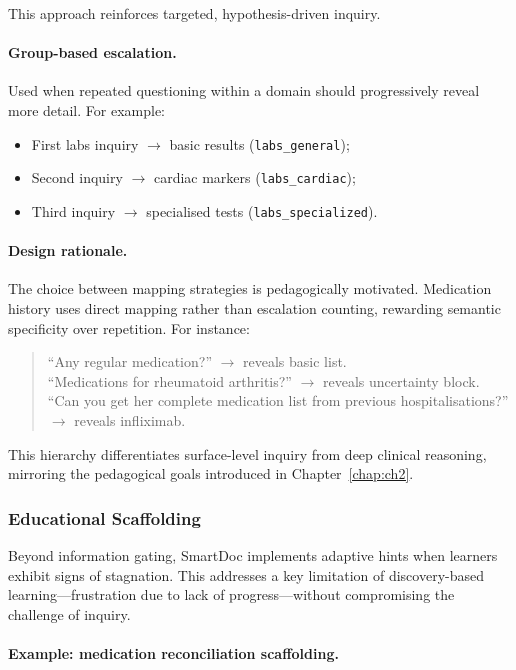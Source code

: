 This approach reinforces targeted, hypothesis-driven inquiry.

\paragraph{Group-based escalation.}
Used when repeated questioning within a domain should progressively reveal more
detail.
For example:

\begin{itemize}
  \item First labs inquiry $\rightarrow$ basic results (\texttt{labs\_general});
  \item Second inquiry $\rightarrow$ cardiac markers (\texttt{labs\_cardiac});
  \item Third inquiry $\rightarrow$ specialised tests (\texttt{labs\_specialized}).
\end{itemize}

\paragraph{Design rationale.}
The choice between mapping strategies is pedagogically motivated.
Medication history uses direct mapping rather than escalation counting,
rewarding semantic specificity over repetition.
For instance:

\begin{quote}
``Any regular medication?'' $\rightarrow$ reveals basic list.\\
``Medications for rheumatoid arthritis?'' $\rightarrow$ reveals uncertainty block.\\
``Can you get her complete medication list from previous hospitalisations?'' $\rightarrow$ reveals infliximab.
\end{quote}

This hierarchy differentiates surface-level inquiry from deep clinical reasoning,
mirroring the pedagogical goals introduced in Chapter~\ref{chap:ch2}.

\subsubsection{Educational Scaffolding}

Beyond information gating, SmartDoc implements adaptive hints when learners exhibit
signs of stagnation.
This addresses a key limitation of discovery-based learning—frustration due to lack of
progress—without compromising the challenge of inquiry.

\paragraph{Example: medication reconciliation scaffolding.}

